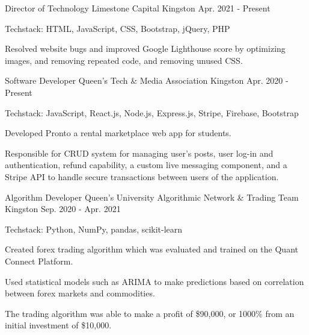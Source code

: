 

\begin{cventries}

  \cventry
    {Director of Technology} %
    {Limestone Capital} %
    {Kingston} %
    {Apr. 2021 - Present} %
    {
      \begin{cvitems} %
        \item {Techstack: HTML, JavaScript, CSS, Bootstrap, jQuery, PHP}
        \item {Resolved website bugs and improved Google Lighthouse score by optimizing images, and removing repeated code, and removing unused CSS.}
      \end{cvitems}
    }
    
  \cventry
    {Software Developer} %
    {Queen’s Tech \& Media Association} %
    {Kingston} %
    {Apr. 2020 - Present} %
    {
      \begin{cvitems} %
        \item {Techstack: JavaScript, React.js, Node.js, Express.js, Stripe, Firebase, Bootstrap}
        \item {Developed Pronto a rental marketplace web app for students.}
        \item {Responsible for CRUD system for managing user’s posts, user log-in and authentication, refund capability, a custom live messaging component, and a Stripe API to handle secure transactions between users of the application.}
      \end{cvitems}
    }

  \cventry
    {Algorithm Developer} %
    {Queen's University Algorithmic Network \& Trading Team} %
    {Kingston} %
    {Sep. 2020 - Apr. 2021} %
    {
      \begin{cvitems} %
        \item {Techstack: Python, NumPy, pandas, scikit-learn}
        \item {Created forex trading algorithm which was evaluated and trained on the Quant Connect Platform.}
        \item {Used statistical models such as ARIMA to make predictions based on correlation between forex markets and commodities.}
        \item {The trading algorithm was able to make a profit of \$90,000, or 1000\% from an initial investment of \$10,000.}
      \end{cvitems}
    }


\end{cventries}
